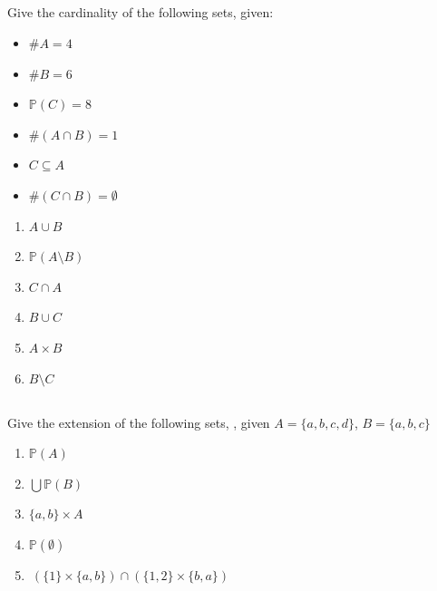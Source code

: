 \documentclass[twocolumn]{article}
\newcommand\mrk[1]{}
\begin{document}
\subsection{}

    Give the cardinality of the following sets, given:

\begin{multicols}{2}
    \begin{itemize}
        \item $\#A = 4$
        \item $\#B = 6$
        \item $\mathbb{P}(C) = 8$
        \item $\#(A \cap B) = 1$
        \item $ C \subseteq A $
        \item $ \# (C \cap B) = \emptyset$
    \end{itemize}
\end{multicols}
\begin{multicols}{2}
    \begin{enumerate}
        \item $ A \cup B $ \mrk{1}
        \item $ \mathbb{P}(A \setminus B)$ \mrk{1}
        \item $ C \cap A $ \mrk{1}
        \item $ B \cup C $ \mrk{1}
        \item $ A \times B $ \mrk{1}
        \item $ B \setminus C$ \mrk{1}
    \end{enumerate}
\end{multicols}

    \subsection{}

    Give the extension of the following sets, , given $A = \{a, b, c, d \}$, $B = \{a, b, c\}$

    \begin{multicols}{2}
        \begin{enumerate}
            \item $\mathbb{P}(A)$ \mrk{1}
            \item $ \bigcup  \mathbb{P}(B)  $ \mrk{1}
            \item $ \{a, b\} \times A $ \mrk{1}
            \item $ \mathbb{P} ( \emptyset ) $ \mrk{1}
        \end{enumerate}
    \end{multicols}
    \begin{enumerate}
        \setcounter{enumi}{4}
        \item $ \ ( \{ 1 \} \times \{ a, b \} ) \cap ( \{ 1, 2 \} \times \{ b, a \} ) $
    \end{enumerate}
\end{document}
